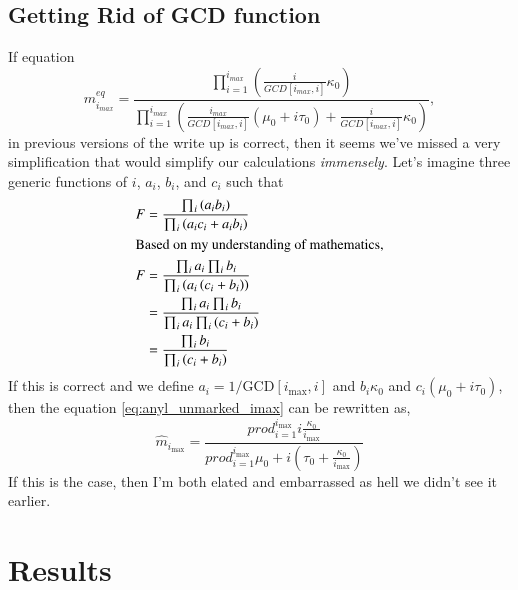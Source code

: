 \documentclass[review]{elsarticle}
\newcommand{\imax}{\ensuremath{i_{\max}}\xspace}
\newcommand{\GCD}{\ensuremath{\text{GCD}}\xspace}
\begin{document}
\subsection*{Getting Rid of GCD function}
If equation
\begin{equation}\label{eq:anyl_unmarked_imax}
m_{i_{max}}^{eq}=\dfrac{\prod_{i=1}^{i_{max}}\left(\frac{i}{GCD[i_{max},i]}\kappa_0\right)}{\prod_{i=1}^{i_{max}}\left(\frac{i_{max}}{GCD[i_{max},i]}(\mu_0+i\tau_0)+\frac{i}{GCD[i_{max},i]}\kappa_0\right)},
\end{equation}
 in previous versions of the write up is correct, then it seems we've missed a very simplification that would simplify our calculations \emph{immensely}.
Let's imagine three generic functions of $i$, $a_i$, $b_i$, and $c_i$ such that
\begin{align}
  F &= \frac{ \prod_i \left(a_i b_i\right)}{\prod_i \left(a_i c_i + a_i b_i\right)}\\
\intertext{Based on my understanding of mathematics,}
  F &= \frac{ \prod_i a_i \prod_i b_i }{\prod_i \left(a_i \left(c_i + b_i\right)\right)}\\
  &= \frac{ \prod_i a_i \prod_i b_i }{\prod_i a_i \prod_i \left(c_i + b_i\right)}\\
  &= \frac{\prod_i b_i }{\prod_i \left(c_i + b_i\right)}\\
\end{align}
If this is correct and we define $a_i = 1/\GCD[\imax, i]$ and $b_i \kappa_0$ and $c_i (\mu_0 + i \tau_0)$, then the equation \ref{eq:anyl_unmarked_imax} can be rewritten as,
\begin{equation}
  \hat{m}_{\imax}= \frac{ prod_{i=1}^{\imax} i \frac{\kappa_0}{\imax}}{prod_{i=1}^{\imax} \mu_0 + i \left(\tau_0 +\frac{\kappa_0}{\imax}\right)} 
\end{equation}
If this is the case, then I'm both elated and embarrassed as hell we didn't see it earlier.


\section{Results}

\end{document}
